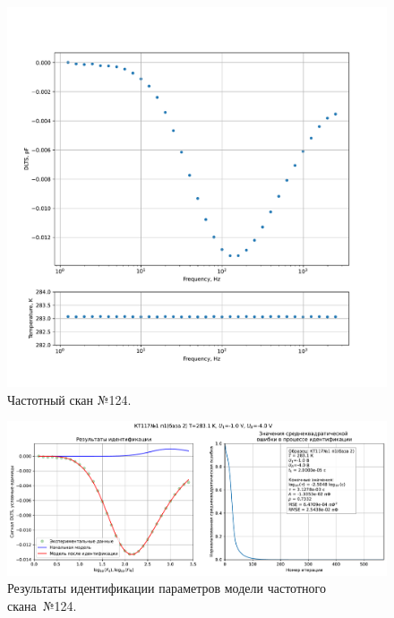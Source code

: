 \begin{figure}[!ht]
    \centering
    \includegraphics[width=1\textwidth]{../plots/КТ117№1_п1(база 2)_2500Гц-1Гц_1пФ_+10С_-1В-4В_200мВ_20мкс_шаг_0,1.pdf}
    \caption{Частотный скан №124.}
    \label{pic:frequency_scan_124}
\end{figure}

\begin{figure}[!ht]
    \centering
    \includegraphics[width=1\textwidth]{../plots/КТ117№1_п1(база 2)_2500Гц-1Гц_1пФ_+10С_-1В-4В_200мВ_20мкс_шаг_0,1_model.pdf}
    \caption{Результаты идентификации параметров модели частотного скана~№124.}
    \label{pic:frequency_scan_model124}
\end{figure}

\pagebreak


